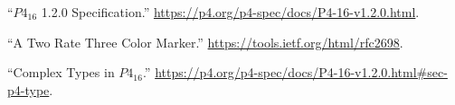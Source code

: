 \documentclass[11pt]{article}
\begin{document}
{%
{%
\begin{thebibliography}{38}%
\label{sec-bibliography}%

\mdbibitemlabel{{}[1]}\textquotedblleft{}$P4_{16}$ 1.2.0 Specification.\textquotedblright{} \href{https://p4.org/p4-spec/docs/P4-16-v1.2.0.html}{{\ttfamily https://\hspace{0pt}p4.\hspace{0pt}org/\hspace{0pt}p4-\hspace{0pt}spec/\hspace{0pt}docs/\hspace{0pt}P4-\hspace{0pt}16-\hspace{0pt}v1.\hspace{0pt}2.\hspace{0pt}0.\hspace{0pt}html}}.\label{p4spec}%

\mdbibitemlabel{{}[2]}\textquotedblleft{}A Two Rate Three Color Marker.\textquotedblright{} \href{https://tools.ietf.org/html/rfc2698}{{\ttfamily https://\hspace{0pt}tools.\hspace{0pt}ietf.\hspace{0pt}org/\hspace{0pt}html/\hspace{0pt}rfc2698}}.\label{rfc2698}%

\mdbibitemlabel{{}[3]}\textquotedblleft{}Complex Types in $P4_{16}$.\textquotedblright{} \href{https://p4.org/p4-spec/docs/P4-16-v1.2.0.html\%23sec-p4-type}{{\ttfamily https://\hspace{0pt}p4.\hspace{0pt}org/\hspace{0pt}p4-\hspace{0pt}spec/\hspace{0pt}docs/\hspace{0pt}P4-\hspace{0pt}16-\hspace{0pt}v1.\hspace{0pt}2.\hspace{0pt}0.\hspace{0pt}html\#\hspace{0pt}sec-\hspace{0pt}p4-\hspace{0pt}type}}.\label{p4complextypes}%


\end{thebibliography}}}
\end{document}
